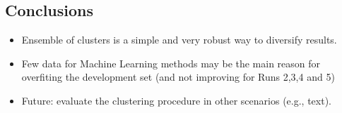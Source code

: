 \documentclass[a0,portrait]{a0poster}
\begin{document}
\begin{multicols}{2}


\color{Navy} %
\section*{Conclusions}
\color{DarkSlateGray} %

\begin{itemize}
\item Ensemble of clusters is a simple and very robust way to diversify results.
\item Few data for Machine Learning methods may be the main reason for overfiting the development set (and not improving for Runs 2,3,4 and 5) 
\item Future: evaluate the clustering procedure in other scenarios (e.g., text).
\end{itemize}









\end{multicols}
\end{document}
